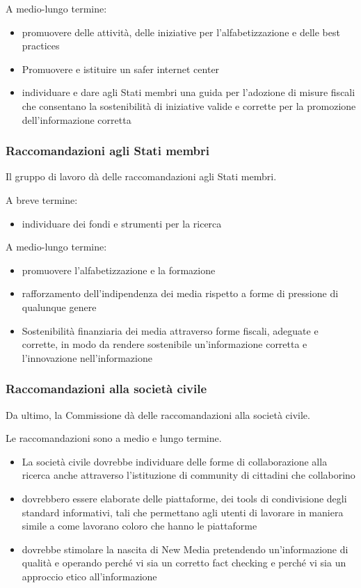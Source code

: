 A medio-lungo termine:

\begin{itemize}
    \item promuovere delle attività, delle iniziative per l'alfabetizzazione e delle best practices
    \item Promuovere e istituire un safer internet center
    \item individuare e dare agli Stati membri una guida per l'adozione di misure fiscali che consentano la sostenibilità di iniziative valide e corrette per la promozione dell'informazione corretta

\end{itemize}

\subsubsection{Raccomandazioni agli Stati membri}
Il gruppo di lavoro dà delle raccomandazioni agli Stati membri.\par

A breve termine:

\begin{itemize}
    \item individuare dei fondi e strumenti per la ricerca
\end{itemize}

A medio-lungo termine:
\begin{itemize}
    \item promuovere l'alfabetizzazione e la formazione
    \item rafforzamento dell'indipendenza dei media rispetto a forme di pressione di qualunque genere
    \item Sostenibilità finanziaria dei media attraverso forme fiscali, adeguate e corrette, in modo da rendere sostenibile un'informazione corretta e l'innovazione nell'informazione
\end{itemize}


\subsubsection{Raccomandazioni alla società civile}
Da ultimo, la Commissione dà delle raccomandazioni alla società civile.\par
Le raccomandazioni sono  a medio e lungo termine. 

\begin{itemize}
    \item La società civile dovrebbe individuare delle forme di collaborazione alla ricerca anche attraverso l'istituzione di community di cittadini che collaborino
    \item dovrebbero essere elaborate delle piattaforme, dei tools di condivisione degli standard informativi, tali che permettano agli utenti di lavorare in maniera simile a come lavorano coloro che hanno  le piattaforme
    \item dovrebbe stimolare la nascita di New Media pretendendo un'informazione di qualità e operando perché vi sia un corretto fact checking e perché vi sia un approccio etico all'informazione
    
\end{itemize}


